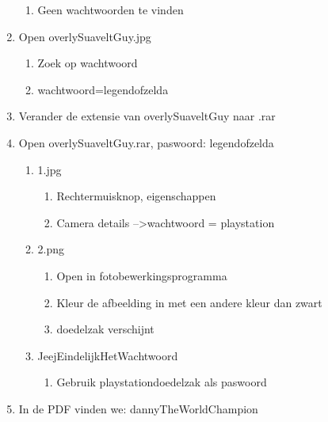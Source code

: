 \begin{enumerate}
\begin{enumerate}
  	\item Geen wachtwoorden te vinden
  	\end{enumerate}
  \item Open overlySuaveltGuy.jpg 
  	\begin{enumerate}
  	\item Zoek op wachtwoord
  	\item wachtwoord=legendofzelda
  	\end{enumerate}
  \item Verander de extensie van overlySuaveltGuy naar .rar
  \item Open overlySuaveltGuy.rar, paswoord: legendofzelda
  	\begin{enumerate}
  	\item 1.jpg
  		\begin{enumerate}
  		\item Rechtermuisknop, eigenschappen
  		\item Camera details --\textgreater wachtwoord = playstation
  		\end{enumerate}
  	\item 2.png
  		\begin{enumerate}
  		\item Open in fotobewerkingsprogramma
  		\item Kleur de afbeelding in met een andere kleur dan zwart
  		\item doedelzak verschijnt
  		\end{enumerate}
  	\item JeejEindelijkHetWachtwoord
  		\begin{enumerate}
  		\item Gebruik playstationdoedelzak als paswoord
  		\end{enumerate}
  	\end{enumerate}
  \item In de PDF vinden we: dannyTheWorldChampion
\end{enumerate}